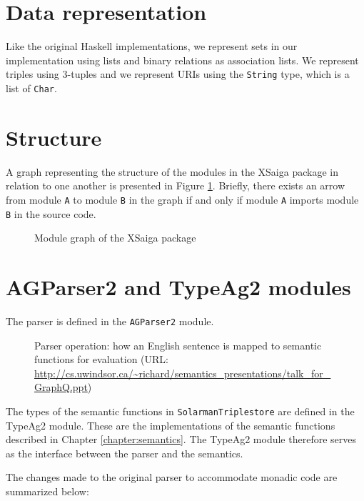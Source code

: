\documentclass[../main.tex]{subfiles}
\begin{document}
\section{Data representation}

Like the original Haskell implementations, we represent sets in our implementation using lists and binary relations as association lists.  We represent triples using 3-tuples and we represent URIs using the \texttt{String} type, which is a list of \texttt{Char}.

\section{Structure}

A graph representing the structure of the modules in the XSaiga package in relation to one another is presented in Figure \ref{fig:modulegraph}.  Briefly, there exists an arrow from module \texttt{A} to module \texttt{B} in the graph if and only if module \texttt{A} imports module \texttt{B} in the source code.

\begin{figure}[h]
	\centering
	\caption{Module graph of the XSaiga package}
	\label{fig:modulegraph}
\end{figure}


\section{AGParser2 and TypeAg2 modules}
\label{section:nonrefparserimpl}

The parser is defined in the \texttt{AGParser2} module.

\begin{figure}[h]
	\centering
	\caption{Parser operation: how an English sentence is mapped to semantic functions for evaluation\cite{frost2014demonstration} (URL: \url{http://cs.uwindsor.ca/~richard/semantics_presentations/talk_for_GraphQ.ppt})}
\end{figure}

The types of the semantic functions in \texttt{SolarmanTriplestore} are defined in the TypeAg2 module.
These are the implementations of the semantic functions described in Chapter \ref{chapter:semantics}.
The TypeAg2 module therefore serves as the interface between the parser and the semantics.

The changes made to the original parser to accommodate monadic code are summarized below:
\end{document}

